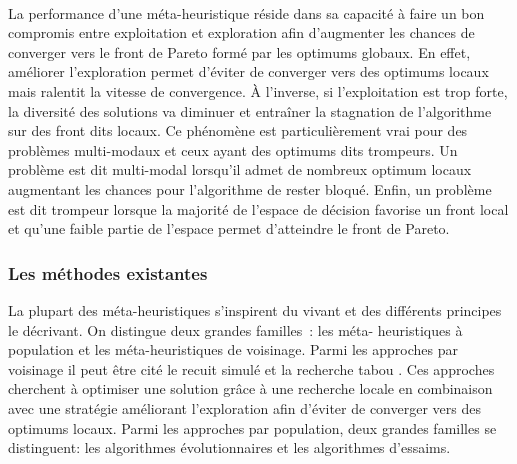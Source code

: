 \paragraph{} %
La performance d’une méta-heuristique réside dans sa capacité à faire un bon
compromis entre exploitation et exploration afin d’augmenter les chances de
converger vers le front de Pareto formé par les optimums globaux. En effet,
améliorer l’exploration permet d’éviter de converger vers des optimums locaux
mais ralentit la vitesse de convergence. À l’inverse, si l’exploitation est trop
forte, la diversité des solutions va diminuer et entraîner la stagnation de
l’algorithme sur des front dits locaux. Ce phénomène est particulièrement vrai
pour des problèmes multi-modaux et ceux ayant des optimums dits trompeurs. Un
problème est dit multi-modal lorsqu’il admet de nombreux optimum locaux
augmentant les chances pour l’algorithme de rester bloqué. Enfin, un problème
est dit trompeur lorsque la majorité de l’espace de décision favorise un front
local et qu’une faible partie de l’espace permet d’atteindre le front de Pareto.


\subsubsection{Les méthodes existantes} %
\label{ssub:les_methodes_existantes}
La plupart des méta-heuristiques s’inspirent du vivant et des différents principes le
décrivant. On distingue deux grandes familles~: les méta- heuristiques à population et les
méta-heuristiques de voisinage. Parmi les approches par
voisinage il peut être cité le recuit simulé et la recherche tabou
\parencite{Paul2010577}. Ces approches cherchent à optimiser une solution grâce à une
recherche locale en combinaison avec une stratégie améliorant l’exploration afin d’éviter
de converger vers des optimums locaux. Parmi les approches par population, deux grandes
familles se distinguent: les algorithmes évolutionnaires et les algorithmes d’essaims.



